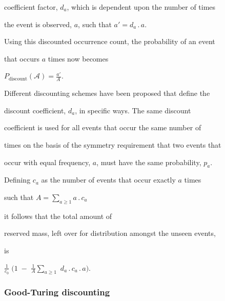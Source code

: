 coefficient factor, $d_a$, which is dependent upon the number of times


the event is observed, $a$, such that $a' = d_a \,.\, a$.


Using this discounted occurrence count, the probability of an event


that occurs $a$ times now becomes


$P_\mathrm{discount}(\mathcal{A}) = \frac{a'}{A\,}$.


Different discounting schemes have been proposed that define the


discount coefficient, $d_a$, in specific ways. The same discount


coefficient is used for all events that occur the same number of


times on the basis of the symmetry requirement that two events that


occur with equal frequency, $a$, must have the same probability, $p_a$.





Defining $c_a$ as the number of events that occur exactly $a$ times


such that $A = \sum_{a\ge 1} a\,.\,c_a$ %




it follows that the total amount of


reserved mass, left over for distribution amongst the unseen events,


is 














$\frac{1}{c_0} \; ( 1\;-$ $\frac{1}{A}\sum_{a\ge 1}$ $d_a\,.\,c_a\,.\,a)$.







\subsubsection{Good-Turing discounting}


